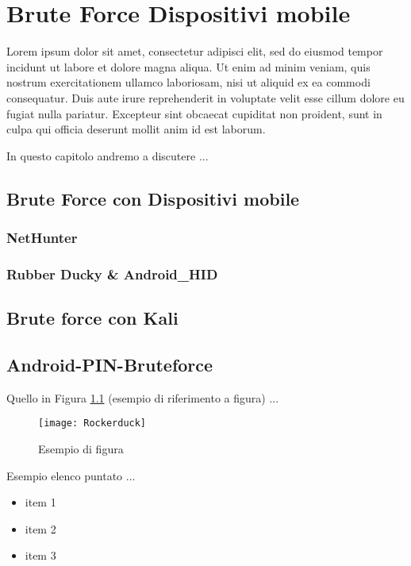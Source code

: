 \chapter{Brute Force Dispositivi mobile}
\label{chap:Capitolo2}
\nocite{html5}

Lorem ipsum dolor sit amet, consectetur adipisci elit, sed do eiusmod tempor incidunt ut labore et dolore magna aliqua. Ut enim ad minim veniam, quis nostrum exercitationem ullamco laboriosam, nisi ut aliquid ex ea commodi consequatur. Duis aute irure reprehenderit in voluptate velit esse cillum dolore eu fugiat nulla pariatur. Excepteur sint obcaecat cupiditat non proident, sunt in culpa qui officia deserunt mollit anim id est laborum.

In questo capitolo andremo a discutere ...

\section{Brute Force con Dispositivi mobile}

\subsection{NetHunter}

\subsection{Rubber Ducky \& Android\_HID}


\section{Brute force con Kali}

  
\section{Android-PIN-Bruteforce}
\label{sec:real-time}
Quello in Figura \ref{fig:rocker}  (esempio di riferimento a figura) ...

\begin{figure}[htpb!]
  \centering
  \texttt{[image: Rockerduck]}
  \caption{Esempio di figura}
  \label{fig:rocker}
\end{figure}

Esempio elenco puntato ...
\begin{itemize}
\item item 1
\item item 2
\item item 3
\end{itemize}

